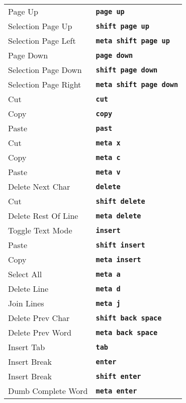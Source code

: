 \documentclass[footexclude,twocolumn,DIV40,fontsize=8.7pt]{scrreprt}
\newcommand{\cmd}[1] {\frenchspacing\texttt{\textbf{{#1}}}}
\begin{document}
{\begin{tabularx}{\hsize}{lX}
                    Page Up & \cmd {page up}\\
                    Selection Page Up & \cmd {shift page up}\\
                    Selection Page Left & \cmd {meta shift page up}\\
                    Page Down & \cmd {page down}\\
                    Selection Page Down & \cmd {shift page down}\\
                    Selection Page Right & \cmd {meta shift page down}\\

                    Cut & \cmd {cut}\\
                    Copy & \cmd {copy}\\
                    Paste & \cmd {past}\\

                    Cut & \cmd {meta x}\\
                    Copy & \cmd {meta c}\\
                    Paste & \cmd {meta v}\\
                    Delete Next Char & \cmd {delete}\\
                    Cut & \cmd {shift delete}\\
                    Delete Rest Of Line & \cmd {meta delete}\\
                    Toggle Text Mode & \cmd {insert}\\
                    Paste & \cmd {shift insert}\\
                    Copy & \cmd {meta insert}\\
                    Select All & \cmd {meta a}\\

                    Delete Line & \cmd {meta d}\\
                    Join Lines & \cmd {meta j}\\

                    Delete Prev Char & \cmd {shift back space}\\
                    Delete Prev Word & \cmd {meta back space}\\
                    Insert Tab & \cmd {tab}\\
                    Insert Break & \cmd {enter}\\
                    Insert Break & \cmd {shift enter}\\
                    Dumb Complete Word & \cmd {meta enter}\\


\end{tabularx}}
\end{document}
